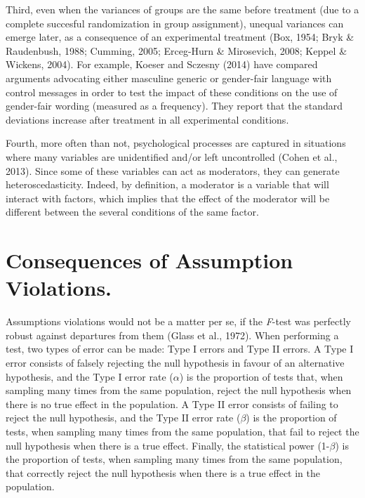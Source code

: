 \documentclass[man,floatsintext]{apa6}
\begin{document}
Third, even when the variances of groups are the same before treatment (due to a complete succesful randomization in group assignment), unequal variances can emerge later, as a consequence of an experimental treatment (Box, 1954; Bryk \& Raudenbush, 1988; Cumming, 2005; Erceg-Hurn \& Mirosevich, 2008; Keppel \& Wickens, 2004). For example, Koeser and Sczesny (2014) have compared arguments advocating either masculine generic or gender-fair language with control messages in order to test the impact of these conditions on the use of gender-fair wording (measured as a frequency). They report that the standard deviations increase after treatment in all experimental conditions.

Fourth, more often than not, psychological processes are captured in situations where many variables are unidentified and/or left uncontrolled (Cohen et al., 2013). Since some of these variables can act as moderators, they can generate heteroscedasticity. Indeed, by definition, a moderator is a variable that will interact with factors, which implies that the effect of the moderator will be different between the several conditions of the same factor.

\hypertarget{consequences-of-assumption-violations.}{%
\section{Consequences of Assumption Violations.}\label{consequences-of-assumption-violations.}}

Assumptions violations would not be a matter per se, if the \emph{F}-test was perfectly robust against departures from them (Glass et al., 1972). When performing a test, two types of error can be made: Type I errors and Type II errors. A Type I error consists of falsely rejecting the null hypothesis in favour of an alternative hypothesis, and the Type I error rate (\(\alpha\)) is the proportion of tests that, when sampling many times from the same population, reject the null hypothesis when there is no true effect in the population. A Type II error consists of failing to reject the null hypothesis, and the Type II error rate (\(\beta\)) is the proportion of tests, when sampling many times from the same population, that fail to reject the null hypothesis when there is a true effect. Finally, the statistical power (1-\(\beta\)) is the proportion of tests, when sampling many times from the same population, that correctly reject the null hypothesis when there is a true effect in the population.
\end{document}
